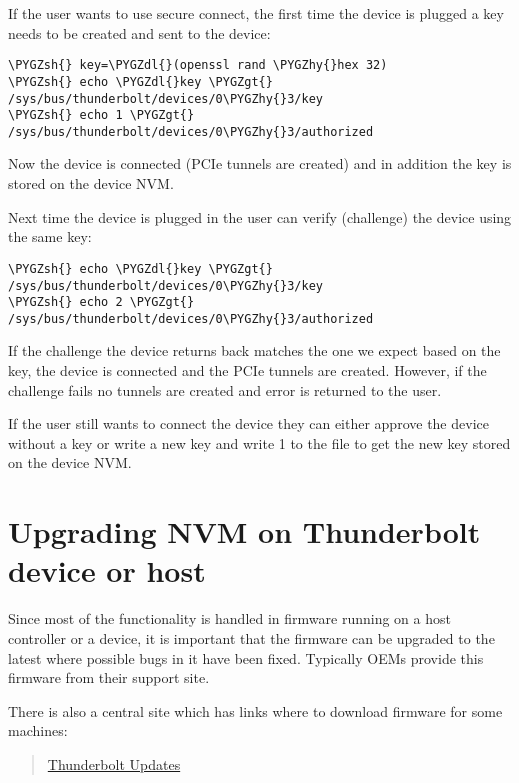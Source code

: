 \documentclass[a4paper,8pt,english]{sphinxmanual}
\def\PYGZgt{\char`\>}
\def\PYGZsh{\char`\#}
\def\PYGZdl{\char`\$}
\def\PYGZhy{\char`\-}
\begin{document}
If the user wants to use secure connect, the first time the device is
plugged a key needs to be created and sent to the device:

\begin{Verbatim}[commandchars=\\\{\}]
\PYGZsh{} key=\PYGZdl{}(openssl rand \PYGZhy{}hex 32)
\PYGZsh{} echo \PYGZdl{}key \PYGZgt{} /sys/bus/thunderbolt/devices/0\PYGZhy{}3/key
\PYGZsh{} echo 1 \PYGZgt{} /sys/bus/thunderbolt/devices/0\PYGZhy{}3/authorized
\end{Verbatim}

Now the device is connected (PCIe tunnels are created) and in addition
the key is stored on the device NVM.

Next time the device is plugged in the user can verify (challenge) the
device using the same key:

\begin{Verbatim}[commandchars=\\\{\}]
\PYGZsh{} echo \PYGZdl{}key \PYGZgt{} /sys/bus/thunderbolt/devices/0\PYGZhy{}3/key
\PYGZsh{} echo 2 \PYGZgt{} /sys/bus/thunderbolt/devices/0\PYGZhy{}3/authorized
\end{Verbatim}

If the challenge the device returns back matches the one we expect based
on the key, the device is connected and the PCIe tunnels are created.
However, if the challenge fails no tunnels are created and error is
returned to the user.

If the user still wants to connect the device they can either approve
the device without a key or write a new key and write 1 to the
 file to get the new key stored on the device NVM.


\section{Upgrading NVM on Thunderbolt device or host}
\label{admin-guide/thunderbolt:upgrading-nvm-on-thunderbolt-device-or-host}
Since most of the functionality is handled in firmware running on a
host controller or a device, it is important that the firmware can be
upgraded to the latest where possible bugs in it have been fixed.
Typically OEMs provide this firmware from their support site.

There is also a central site which has links where to download firmware
for some machines:
\begin{quote}

\href{https://thunderbolttechnology.net/updates}{Thunderbolt Updates}
\end{quote}
\end{document}
